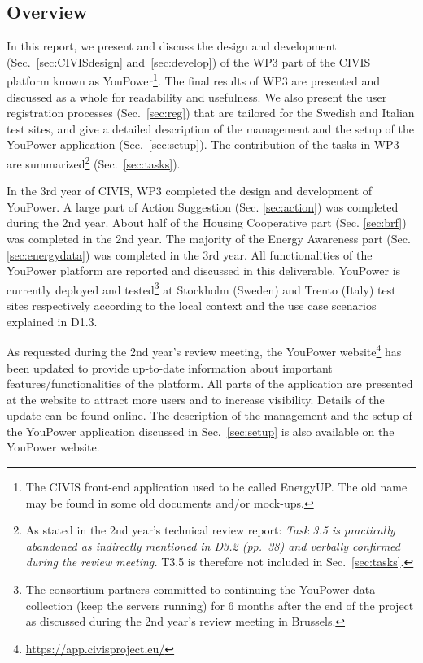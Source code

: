 \subsection{Overview}

In this report, we present and discuss the design and development (Sec.~\ref{sec:CIVISdesign} and~\ref{sec:develop}) of the WP3 part of the CIVIS platform known as YouPower\footnote{The CIVIS front-end application used to be called EnergyUP. The old name may be found in some old documents and/or mock-ups.}. 
The final results of WP3 are presented and discussed as a whole for readability and usefulness. 
% 
We also present the user registration processes (Sec.~\ref{sec:reg}) that are tailored for the Swedish and Italian test sites, and give a detailed description of the management and the setup of the YouPower application (Sec.~\ref{sec:setup}). The contribution of the tasks in WP3 are summarized\footnote{As stated in the 2nd year's technical review report: \textit{Task 3.5 is practically abandoned as indirectly mentioned in D3.2 (pp.~38) and verbally confirmed
during the review meeting.} T3.5 is therefore not included in Sec.~\ref{sec:tasks}.} (Sec.~\ref{sec:tasks}). 

In the 3rd year of CIVIS, WP3 completed the design and development of YouPower. A large part of Action Suggestion (Sec. \ref{sec:action}) was completed during the 2nd year. About half of the Housing Cooperative part (Sec. \ref{sec:brf}) was completed in the 2nd year. The majority of the Energy Awareness part (Sec. \ref{sec:energydata}) was completed in the 3rd year. 
All functionalities of the YouPower platform are reported and discussed in this deliverable. YouPower is currently deployed and tested\footnote{The consortium partners committed to continuing the YouPower data collection (keep the servers running) for 6 months after the end of the project as discussed during the 2nd year's review meeting in Brussels.} at Stockholm (Sweden) and Trento (Italy) test sites respectively according to the local context and the use case scenarios explained in D1.3. 

As requested during the 2nd year's review meeting, the YouPower website\footnote{\url{https://app.civisproject.eu/}} has been updated to provide up-to-date information about important features/functionalities of the platform. All parts of the application are presented at the website to attract more users and to increase visibility.  Details of the update can be found online. The description of the management and the setup of the YouPower application discussed in Sec.~\ref{sec:setup} is also available on the YouPower website.

